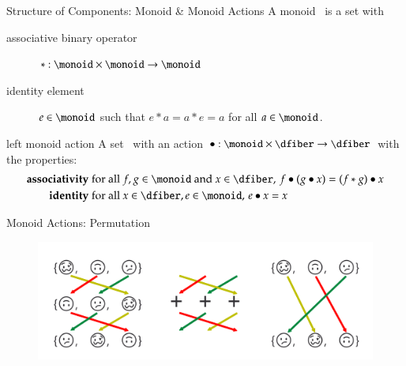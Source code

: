 \documentclass[xcolor={dvipsnames}, handout]{beamer}
\begin{document}
\begin{frame}{Structure of Components: Monoid \& Monoid Actions}
A monoid \monoid\ is a set with
\begin{description}
    \item[associative binary operator] $\ast:\monoid \times \monoid\rightarrow \monoid$
    \item[identity element] $e\in \monoid$ such that $e\ast a= a \ast e = a$ for all $a \in \monoid$. 
\end{description}
\pause
\begin{block}{left monoid action}
A set \dfiber\ with an action $\bullet: \monoid\times \dfiber \rightarrow \dfiber$ with the properties:
    \begin{align*}
        \textbf{associativity}\;& \text{for all } f,g \in \monoid \text{ and } x\in \dfiber,\, f\bullet(g\bullet x) = (f\ast g) \bullet x\\
        \textbf{identity}\;& \text{for all } x\in \dfiber, e\in \monoid,\,  e\bullet x = x 
    \end{align*}
\end{block}
\end{frame}

\begin{frame}{Monoid Actions: Permutation}
    \begin{figure}
        \includegraphics[width=1\linewidth]{figures/math/monoid_emoji.png}
    \end{figure}
\end{frame}
\end{document}
